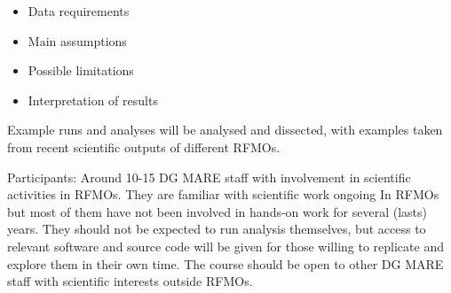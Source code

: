 \documentclass[a4paper,10pt]{article}
\begin{document}
\begin{itemize}
 \item  Data requirements
 \item  Main assumptions
 \item  Possible limitations
 \item  Interpretation of results
\end{itemize}

Example runs and analyses will be analysed and dissected, with examples taken from recent scientific outputs of different RFMOs.

Participants: Around 10-15  DG MARE staff with involvement in scientific activities in RFMOs. They are familiar with scientific work ongoing In RFMOs but most of them have not been involved in hands-on work for several (lasts) years. They should not be expected to run analysis themselves, but access to relevant software and source code will be given for those willing to replicate and explore them in their own time. The course should be open to other DG MARE staff with scientific interests outside RFMOs.

 
\end{document}
